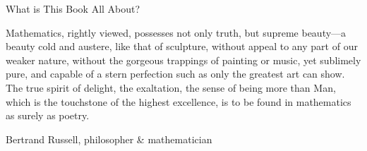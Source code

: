 \begin{section}{What is This Book All About?}

\epigraph{Mathematics, rightly viewed, possesses not only truth, but supreme beauty---a beauty cold and austere, like that of sculpture, without appeal to any part of our weaker nature, without the gorgeous trappings of painting or music, yet sublimely pure, and capable of a stern perfection such as only the greatest art can show. The true spirit of delight, the exaltation, the sense of being more than Man, which is the touchstone of the highest excellence, is to be found in mathematics as surely as poetry.}{Bertrand Russell, philosopher \& mathematician}

\end{section}

